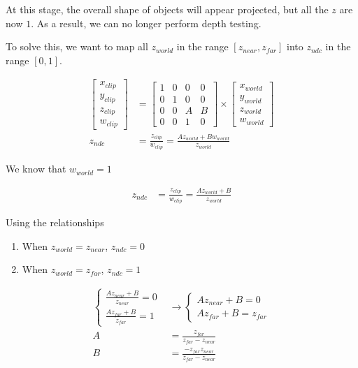     At this stage, the overall shape of objects will appear projected, but
    all the $ z $ are now $ 1 $. As a result, we can no longer perform depth
    testing.

    To solve this, we want to map all $ z_{world} $ in the range
    $ \left[z_{near}, z_{far} \right] $ into $ z_{ndc} $ in
    the range $ \left[0, 1\right] $.

    \begin{align*}
      \begin{bmatrix}
        x_{clip} \\
        y_{clip} \\
        z_{clip} \\
        w_{clip}
      \end{bmatrix}
      &=
      \begin{bmatrix}
        1 & 0 & 0 & 0 \\
        0 & 1 & 0 & 0 \\
        0 & 0 & A & B \\
        0 & 0 & 1 & 0
      \end{bmatrix}
      \times
      \begin{bmatrix}
        x_{world} \\
        y_{world} \\
        z_{world} \\
        w_{world}
      \end{bmatrix} \\
      z_{ndc} &= \frac{z_{clip}}{w_{clip}} = \frac{A z_{world} + B w_{world}}{z_{world}}
    \end{align*}

    We know that $ w_{world} = 1 $

    \begin{align*}
      z_{ndc} &= \frac{z_{clip}}{w_{clip}} = \frac{A z_{world} + B}{z_{world}}
    \end{align*}

    Using the relationships

    \begin{enumerate}
      \item When $ z_{world} = z_{near} $, $ z_{ndc} = 0 $
      \item When $ z_{world} = z_{far} $, $ z_{ndc} = 1 $
    \end{enumerate}

    \begin{align*}
      \begin{cases}
        \frac{A z_{near} + B}{z_{near}} = 0 \\
        \frac{A z_{far} + B}{z_{far}} = 1
      \end{cases}
      &\to
      \begin{cases}
        A z_{near} + B = 0 \\
        A z_{far} + B = z_{far}
      \end{cases} \\
      A &= \frac{z_{far}}{z_{far} - z_{near}} \\
      B &= \frac{- z_{far} z_{near}}{z_{far} - z_{near}}
    \end{align*}

